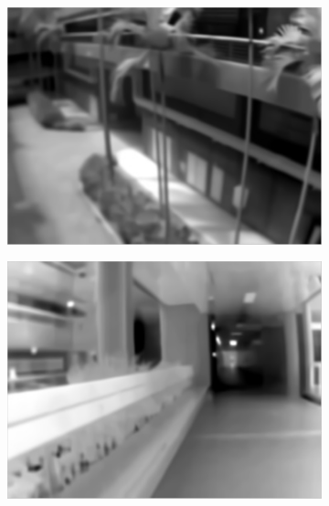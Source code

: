 \begin{figure}
	\begin{subfigure}{0.49\columnwidth}
    \centering
    \includegraphics[width=1.00\textwidth]{media/V_E_highsnrori.jpg}
    	\caption{}
		\label{fig:edgeprocessing_3}
  \end{subfigure}
	\begin{subfigure}{0.49\columnwidth}
    \centering
    \includegraphics[width=1.00\textwidth]{media/V_E_lowsnrori.jpg}
		\caption{}
		\label{fig:edgeprocessing_4}
  \end{subfigure} \vspace{10pt} \\ 
	\begin{subfigure}{0.49\columnwidth}
    \centering

\end{subfigure}
\end{figure}
